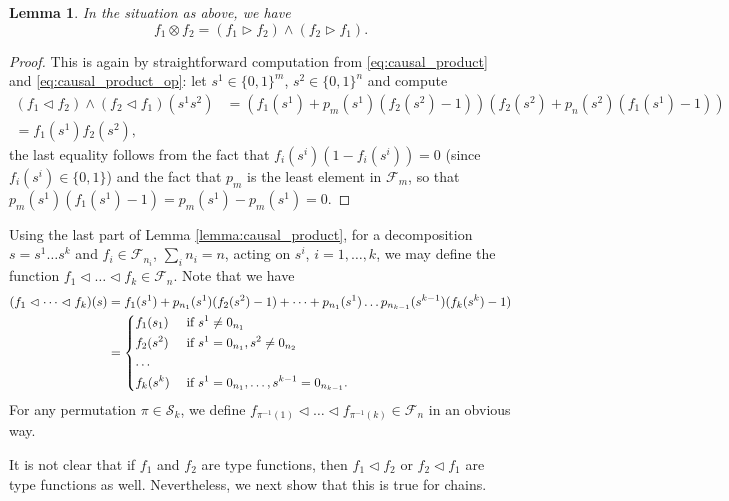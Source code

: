 \documentclass[12pt]{article}
\newtheorem{lemma}{Lemma}
\theoremstyle{definition}
\theoremstyle{remark}
\def\Fe{\mathcal F}
\def\permut{\mathscr{S}}
\def\vtl{\vartriangleleft}
\def\vtr{\vartriangleright}
\begin{document}
\begin{lemma}\label{lemma:causal_tensor} In the situation as above, we have
\[
f_1\otimes f_2 = (f_1\vtr f_2)\wedge (f_2\vtr f_1).
\]

\end{lemma}


\begin{proof} This is again by straightforward computation from \eqref{eq:causal_product}
and \eqref{eq:causal_product_op}: let
$s^1\in \{0,1\}^m$, $s^2\in \{0,1\}^n$ and compute
\begin{align*}
(f_1\vtl f_2)\wedge (f_2\vtl
f_1)(s^1s^2)&=\left(f_1(s^1)+p_{m}(s^1)(f_2(s^2)-1)\right)\left(f_2(s^2)+p_{n}(s^2)(f_1(s^1)-1)\right)\\
=f_1(s^1)f_2(s^2),
\end{align*}
the last equality follows from the fact that $f_i(s^i)(1-f_i(s^i))=0$ (since $f_i(s^i)\in
\{0,1\}$) and the fact that $p_m$ is the least element in $\Fe_m$, so that
$p_m(s^1)(f_1(s^1)-1)=p_m(s^1)-p_m(s^1)=0$. 

\end{proof}

Using the last part of Lemma \ref{lemma:causal_product},
for a decomposition $s=s^1\dots s^k$ and $f_i\in \Fe_{n_i}$, $\sum_i n_i=n$,  acting on
$s^i$, $i=1,\dots,k$, we may define the function $f_1\vtl\dots \vtl f_k\in
\Fe_{n}$. Note that we have 
\begin{align*}
(f_1\vtl \dots\vtl f_k)(s)&=f_1(s^1)+p_{n_1}(s^1)(f_2(s^2)-1)+\dots + p_{n_1}(s^1)\dots
p_{n_{k-1}}(s^{k-1})(f_k(s^k)-1)\\
&= \begin{dcases} f_1(s_1) & \text{ if } s^1\ne 0_{n_1}\\
f_2(s^2) & \text{ if } s^1=0_{n_1}, s^2\ne 0_{n_2}\\
\dots & \\
f_k(s^k) & \text{ if } s^1=0_{n_1},\dots,  s^{k-1}=0_{n_{k-1}}.
\end{dcases}
\end{align*}
For any permutation $\pi\in \permut_k$, we define  $f_{\pi^{-1}(1)}\vtl \dots \vtl
f_{\pi^{-1}(k)}\in \Fe_n$ in an obvious way.





It is not clear that if $f_1$ and $f_2$ are type functions, then $f_1\vtl f_2$ or $f_2\vtl
f_1$ are type functions as well. Nevertheless, we next show that this is true for chains.
\end{document}
